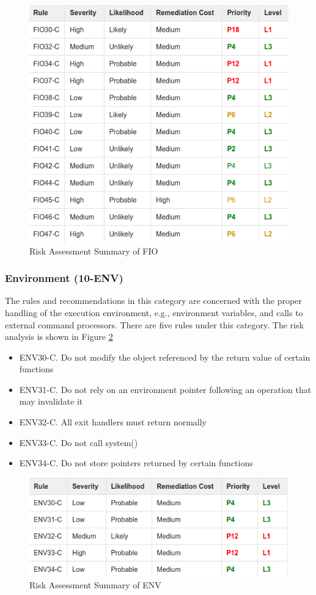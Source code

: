 \begin{figure}[H]
	
	
	\centering
	\includegraphics[width=.6\linewidth]{Figures/fio}
	\caption{Risk Assessment Summary of FIO}
	\label{fig:10}
	
\end{figure}
 
\subsubsection{Environment (10-ENV)} The rules and recommendations in this category are concerned with the proper handling of the execution environment, e.g., environment variables, and calls to external command processors. There are five rules under this category. The risk analysis is shown in Figure \ref{fig:11}\cite{cert-c}
\begin{itemize}
\item ENV30-C. Do not modify the object referenced by the return value of certain functions

\item ENV31-C. Do not rely on an environment pointer following an operation that may invalidate it

\item ENV32-C. All exit handlers must return normally

\item ENV33-C. Do not call system()

\item ENV34-C. Do not store pointers returned by certain functions
\end{itemize}
\begin{figure}[H]
	
	
	\centering
	\includegraphics[width=.6\linewidth]{Figures/env}
	\caption{Risk Assessment Summary of ENV}
	\label{fig:11}
	
\end{figure}

